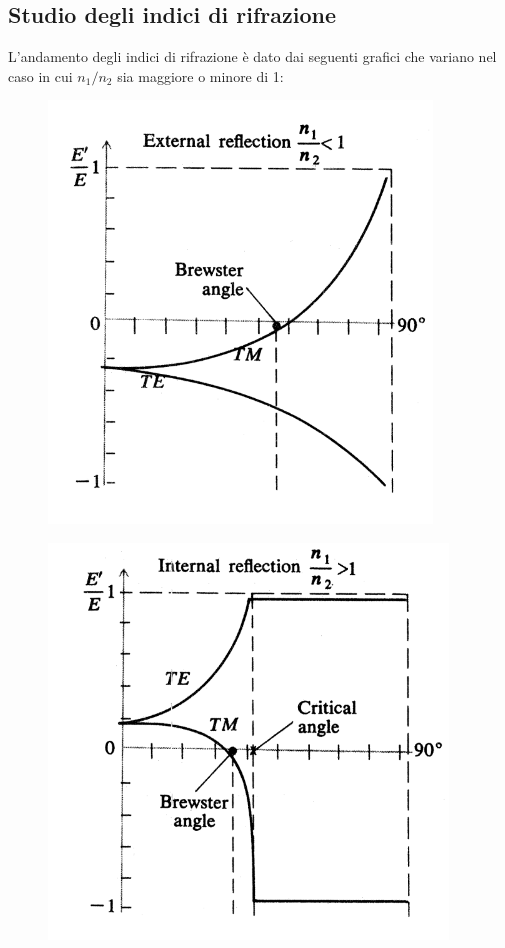 \subsection{Studio degli indici di rifrazione}
L'andamento degli indici di rifrazione è dato dai seguenti grafici che variano nel caso in cui $n_{1}/n_{2}$ sia maggiore o minore di 1: 
\begin{figure}[!h]
    \centering
    \includegraphics[scale=0.5]{riflessione/R1}
\end{figure}
\begin{figure}[!h]
    \centering
    \includegraphics[scale=0.5]{riflessione/R2}
\end{figure}
